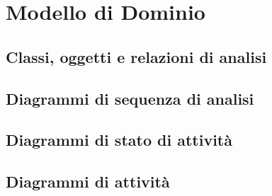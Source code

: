 %
%	 
%

\chapter{Modello di Dominio}

\section{Classi, oggetti e relazioni di analisi}

\section{Diagrammi di sequenza di analisi}

\section{Diagrammi di stato di attività}



\section{Diagrammi di attività}


